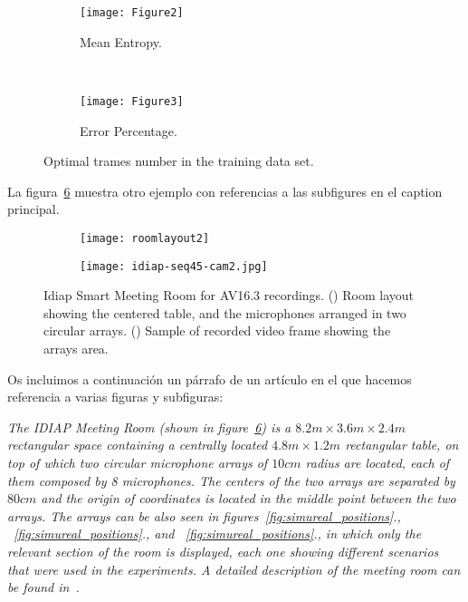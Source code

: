 \begin{figure}
  \centering
  \begin{subfigure}[b]{0.3\textwidth}
    \texttt{[image: Figure2]}
    \caption{Mean Entropy.}
    \label{fig:fig3a}
  \end{subfigure}%
  ~ %
  \begin{subfigure}[b]{0.3\textwidth}
    \texttt{[image: Figure3]}
    \caption{Error Percentage.}
    \label{fig:fig3b}
  \end{subfigure}
  \caption{Optimal trames number in the training data set.}
  \label{fig:fig3}
\end{figure}

La figura~\ref{fig:LIdiapRoom} muestra otro ejemplo con referencias a las subfigures en el caption principal.

\begin{figure}
  \centering
  \begin{subfigure}[b]{0.30\textwidth}
    \texttt{[image: roomlayout2]}
    \caption{}
    \label{fig:RoomLayout}
  \end{subfigure}%
  \qquad \qquad %
  \begin{subfigure}[b]{0.425\textwidth}
    \texttt{[image: idiap-seq45-cam2.jpg]}
    \caption{}
    \label{fig:RoomPicture}
  \end{subfigure}
  \caption{Idiap Smart Meeting Room for AV16.3 recordings. (\protect{}) Room layout showing the centered table, and the microphones arranged in two circular arrays. (\protect{}) Sample of recorded video frame showing the arrays area. %
  }
  \label{fig:LIdiapRoom}
\end{figure}

Os incluimos a continuación un párrafo de un artículo en el que hacemos referencia a varias figuras y subfiguras:

\emph{The IDIAP Meeting Room (shown in figure~\ref{fig:LIdiapRoom}) is a $8.2m \times 3.6m \times 2.4m$ rectangular space containing a centrally located $4.8m \times 1.2m$ rectangular table, on top of which two circular microphone arrays of $10 cm$ radius are located, each of them composed by 8 microphones. The centers of the two arrays are separated by $80 cm$ and the origin of coordinates is located in the middle point between the two arrays. The arrays can be also seen in figures~\ref{fig:simureal_positions}., ~\ref{fig:simureal_positions}., and ~\ref{fig:simureal_positions}., in which only the relevant section of the room is displayed, each one showing different scenarios that were used in the experiments. A detailed description of the meeting room can be found in~\cite{moore2002}.}

